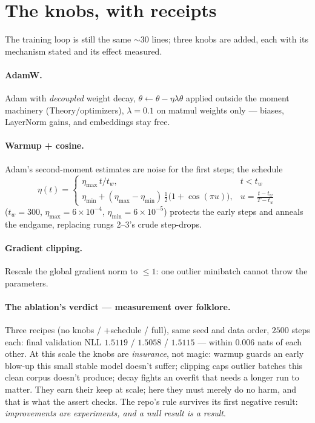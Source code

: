 \documentclass[11pt]{article}
\begin{document}
\section{The knobs, with receipts}

The training loop is still the same $\sim$30 lines; three knobs are
added, each with its mechanism stated and its effect measured.

\paragraph{AdamW.} Adam with \emph{decoupled} weight decay,
$\theta \leftarrow \theta - \eta\lambda\theta$ applied outside the
moment machinery (Theory/optimizers), $\lambda = 0.1$ on matmul
weights only --- biases, LayerNorm gains, and embeddings stay free.

\paragraph{Warmup + cosine.} Adam's second-moment estimates are noise
for the first steps; the schedule
\begin{equation}
  \eta(t) =
  \begin{cases}
    \eta_{\max}\, t/t_w, & t < t_w\\[2pt]
    \eta_{\min} + (\eta_{\max}-\eta_{\min})\,
    \tfrac12\bigl(1 + \cos(\pi u)\bigr), & u = \tfrac{t - t_w}{T - t_w}
  \end{cases}
  \label{eq:cosine}
\end{equation}
($t_w = 300$, $\eta_{\max} = 6\times10^{-4}$,
$\eta_{\min} = 6\times10^{-5}$) protects the early steps and anneals
the endgame, replacing rungs 2--3's crude step-drops.

\paragraph{Gradient clipping.} Rescale the global gradient norm to
$\le 1$: one outlier minibatch cannot throw the parameters.

\paragraph{The ablation's verdict --- measurement over folklore.}
Three recipes (no knobs / +schedule / full), same seed and data order,
$2500$ steps each: final validation NLL $1.5119$ / $1.5058$ / $1.5115$
--- within $0.006$ nats of each other. At this scale the knobs are
\emph{insurance}, not magic: warmup guards an early blow-up this small
stable model doesn't suffer; clipping caps outlier batches this clean
corpus doesn't produce; decay fights an overfit that needs a longer
run to matter. They earn their keep at scale; here they must merely do
no harm, and that is what the assert checks. The repo's rule survives
its first negative result: \emph{improvements are experiments, and a
null result is a result}.
\end{document}
